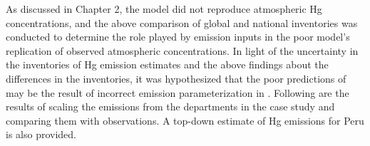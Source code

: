 \begin{flushleft}
    As discussed in Chapter 2, the \on model did not reproduce atmospheric Hg concentrations, and the above comparison of global and national inventories was conducted to determine the role played by emission inputs in the poor model's replication of observed atmospheric concentrations. In light of the uncertainty in the inventories of Hg emission estimates and the above findings about the differences in the inventories, it was hypothesized that the poor predictions of \on may be the result of incorrect emission parameterization in \gc. Following are the results of scaling the emissions from the departments in the case study and comparing them with observations. A top-down estimate of Hg emissions for Peru is also provided.
\end{flushleft}

